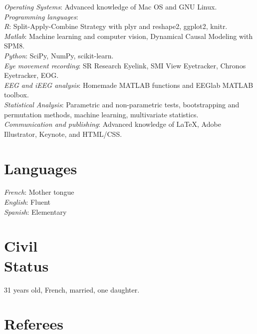 \documentclass[margin,line]{resume}
\begin{document}
\begin{resume}
	\textsl{Operating Systems}: Advanced knowledge of Mac OS and GNU Linux.\\
	\textsl{Programming languages}: \\
		\phantom{1em} \textsl{R}: Split-Apply-Combine Strategy with plyr and reshape2, ggplot2, knitr.\\
		\phantom{1em} \textsl{Matlab}: Machine learning and computer vision, Dynamical Causal Modeling with SPM8.\\
		\phantom{1em} \textsl{Python}: SciPy, NumPy, scikit-learn.\\
	\textsl{Eye movement recording}: SR Research Eyelink, SMI View Eyetracker, Chronos Eyetracker, EOG.\\
	\textsl{EEG and iEEG analysis}: Homemade MATLAB functions and EEGlab MATLAB toolbox.\\
	\textsl{Statistical Analysis}: Parametric and non-parametric tests, bootstrapping and permutation methods, machine learning, multivariate statistics.\\
	\textsl{Communication and publishing}: Advanced knowledge of \LaTeX, Adobe Illustrator, Keynote, and HTML/CSS.





\vspace{3mm}
    \section{\mysidestyle Languages}
	\textsl{French}: Mother tongue\\
	\textsl{English}: Fluent\\
	\textsl{Spanish}: Elementary

    \section{\mysidestyle Civil\\Status}
    31 years old, French, married, one daughter.	

\vspace{3mm}	
	\section{\mysidestyle Referees} 


\end{resume}
\end{document}
